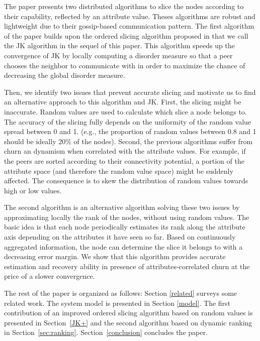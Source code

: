 \documentclass[times,10pt,twocolumn]{article}
\begin{document}

The paper presents two distributed algorithms to slice the nodes
according to their capability, reflected by an attribute value. 
Theses algorithms are robust and lightweight due to their
gossip-based communication pattern.
The first algorithm of the paper builds upon the ordered 
slicing algorithm proposed in \cite{JK06} that we call the JK algorithm in the
sequel of this paper.
This algorithm speeds up the convergence of JK by locally computing a 
disorder measure so that a peer chooses the neighbor to communicate 
with in order to  maximize the chance of decreasing the global disorder 
measure.


Then, we identify two issues that prevent accurate slicing and motivate 
us to find an alternative approach to this algorithm and JK.
First, the slicing might be inaccurate.
Random values are used
 to calculate which slice a node belongs to. 
The accuracy of the slicing fully depends on the uniformity of the random value
 spread between 0 and 1. 
(e.g., the proportion of 
random values between 0.8 and 1 should be ideally 20\% of the nodes). 
Second, the previous algorithms suffer from churn an dynamism
when correlated with the attribute values. For example, if the peers are 
sorted according to their connectivity potential, 
a portion of the attribute space (and therefore the random value space) might be 
suddenly affected. 
The consequence is to skew the distribution of random values towards high or low 
values.


The second algorithm is an alternative algorithm solving these two issues  
by approximating locally the rank of the nodes, without
using random values.
  The basic idea is that each node periodically estimates its rank 
along the attribute axis depending on the attributes it have seen so far.
Based on continuously aggregated information, 
the node can determine the
slice it belongs to with a decreasing error margin.  
We show that this algorithm provides accurate estimation and recovery ability in presence 
of attributes-correlated churn at the price of a slower convergence.



The rest of the paper is organized as follows: Section \ref{related} surveys some related work. 
The system model is presented in Section \ref{model}. 
The first contribution of an improved ordered slicing algorithm based 
on random values is presented  in Section~\ref{JK+} and the second algorithm 
based on dynamic ranking in Section~\ref{sec:ranking}. 
Section~\ref{conclusion} concludes the paper.
\end{document}
